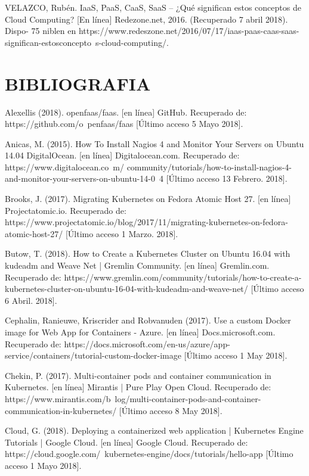 VELAZCO, Rubén. IaaS, PaaS, CaaS, SaaS – ¿Qué significan estos conceptos de Cloud Computing? [En línea] Redezone.net, 2016. (Recuperado 7 abril 2018). Dispo- 75 niblen en https://www.redeszone.net/2016/07/17/iaas-paas-caas-saas-significan-estosconcepto\ s-cloud-computing/.

    
     \newpage\chapter{BIBLIOGRAFIA}
     
     Alexellis (2018). openfaas/faas. [en línea] GitHub. Recuperado de: https://github.com/o\ penfaas/faas [Último acceso 5 Mayo 2018].
     
     Anicas, M. (2015). How To Install Nagios 4 and Monitor Your Servers on Ubuntu 14.04 DigitalOcean. [en línea] Digitalocean.com. Recuperado de: https://www.digitalocean.co\ m/
community/tutorials/how-to-install-nagios-4-and-monitor-your-servers-on-ubuntu-14-0\ 4 [Último acceso 13 Febrero. 2018].

Brooks, J. (2017). Migrating Kubernetes on Fedora Atomic Host 27. [en línea] Projectatomic.io. Recuperado de: https://www.projectatomic.io/blog/2017/11/migrating-kubernetes-on-fedora-atomic-host-27/ [Último acceso 1 Marzo. 2018].

Butow, T. (2018). How to Create a Kubernetes Cluster on Ubuntu 16.04 with kudeadm and Weave Net | Gremlin Community. [en línea] Gremlin.com. Recuperado de: https://www.gremlin.com/community/tutorials/how-to-create-a-kubernetes-cluster-on-ubuntu-16-04-with-kudeadm-and-weave-net/ [Último acceso 6 Abril. 2018].

Cephalin, Ranieuwe, Kriscrider and Robvanuden (2017). Use a custom Docker image for Web App for Containers - Azure. [en línea] Docs.microsoft.com. Recuperado de: https://docs.microsoft.com/en-us/azure/app-service/containers/tutorial-custom-docker-image [Último acceso 1 May 2018].

Chekin, P. (2017). Multi-container pods and container communication in Kubernetes. [en línea] Mirantis | Pure Play Open Cloud. Recuperado de: https://www.mirantis.com/b\ log/multi-container-pods-and-container-communication-in-kubernetes/ [Último acceso 8 May 2018].


Cloud, G. (2018). Deploying a containerized web application  |  Kubernetes Engine Tutorials  |  Google Cloud. [en línea] Google Cloud. Recuperado de: https://cloud.google.com/\ kubernetes-engine/docs/tutorials/hello-app [Último acceso 1 Mayo 2018].


